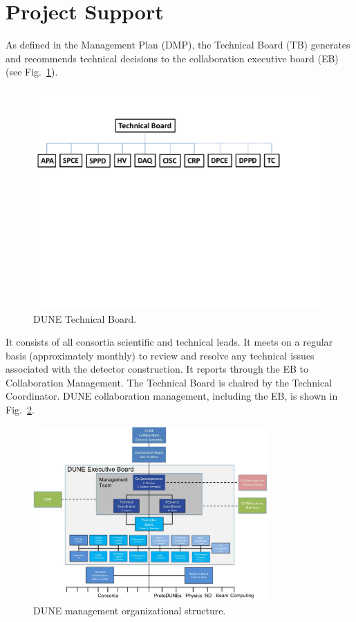 \section{Project Support}
\label{sec:fdsp-coord-supp}

As defined in the  Management Plan (DMP), the 
Technical Board (TB) generates and recommends technical decisions to the 
collaboration executive board (EB) (see Fig.~\ref{fig:TB_org}).
\begin{figure}[htb]
  \begin{center}
    \includegraphics[width=\textwidth]{far-detector-generic/figures/TB_Org_Chart}
    \caption{DUNE Technical Board.}
    \label{fig:TB_org}
  \end{center}
\end{figure}
It consists of all consortia scientific and technical leads. It meets
on a regular basis (approximately monthly) to review and resolve any
technical issues associated with the detector construction. It reports
through the EB to Collaboration Management. The  Technical
Board is chaired by the Technical Coordinator. DUNE collaboration
management, including the EB, is shown in Fig.~\ref{fig:DUNE_org}.
\begin{figure}[htb]
  \begin{center}
    \includegraphics[width=0.8\textwidth]{far-detector-generic/figures/DUNE_mgmt}
    \caption{DUNE management organizational structure.}
    \label{fig:DUNE_org}
  \end{center}
\end{figure}
